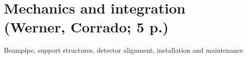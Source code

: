 \section{Mechanics and integration (Werner, Corrado; 5 p.)}
Beampipe, support structures, detector alignment, installation and maintenance
